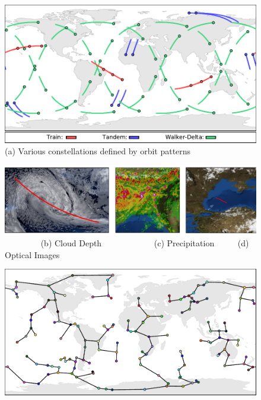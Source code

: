 \documentclass[conference]{IEEEtran}
\begin{document}
\begin{figure}[b!]
  \begin{minipage}[b]{\linewidth}
    \begin{center}
      \includegraphics[width=\textwidth]{images/constellations.pdf}
      {\footnotesize(a) Various constellations defined by orbit patterns}
    \end{center}
    \medskip
  \end{minipage}
  \begin{minipage}[b]{\linewidth}
    \begin{center}
      \includegraphics[width=\textwidth]{images/remote_sensing.pdf}
      {\footnotesize{
          \color{white}~~~~~~~~\color{black}
          (b) Cloud Depth~~~~~~~~~~~~
          (c) Precipitation~~~~~
          (d) Optical Images}}
    \end{center}
    \medskip
  \end{minipage}
  \begin{minipage}[b]{\linewidth}
    \begin{center}
      \includegraphics[width=\textwidth]{images/prim.pdf}

\end{center}
\end{minipage}
\end{figure}
\end{document}
